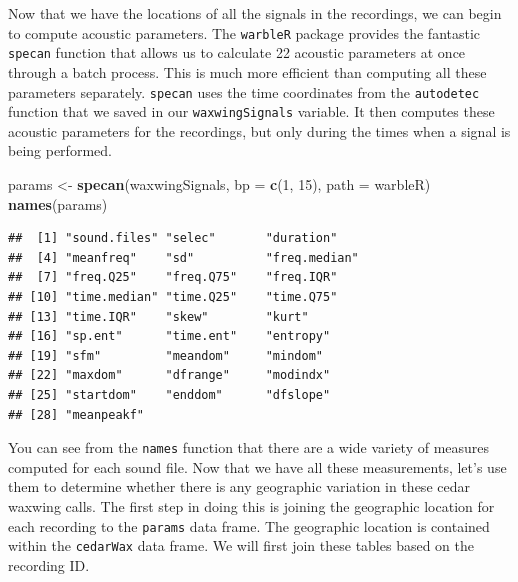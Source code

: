 \documentclass[
]{krantz}
\newenvironment{Shaded}{\begin{snugshade}}{\end{snugshade}}
\newcommand{\CharTok}[1]{\textcolor[rgb]{0.31,0.60,0.02}{#1}}
\newcommand{\DataTypeTok}[1]{\textcolor[rgb]{0.13,0.29,0.53}{#1}}
\newcommand{\DecValTok}[1]{\textcolor[rgb]{0.00,0.00,0.81}{#1}}
\newcommand{\KeywordTok}[1]{\textcolor[rgb]{0.13,0.29,0.53}{\textbf{#1}}}
\newcommand{\NormalTok}[1]{#1}
\newcommand{\OperatorTok}[1]{\textcolor[rgb]{0.81,0.36,0.00}{\textbf{#1}}}
\newcommand{\StringTok}[1]{\textcolor[rgb]{0.31,0.60,0.02}{#1}}
\begin{document}
Now that we have the locations of all the signals in the recordings, we can begin to compute acoustic parameters. The \texttt{warbleR} package provides the fantastic \texttt{specan} function that allows us to calculate 22 acoustic parameters at once through a batch process. This is much more efficient than computing all these parameters separately. \texttt{specan} uses the time coordinates from the \texttt{autodetec} function that we saved in our \texttt{waxwingSignals} variable. It then computes these acoustic parameters for the recordings, but only during the times when a signal is being performed.

\begin{Shaded}
\begin{Highlighting}[]
\NormalTok{params \textless{}{-}}\StringTok{ }\KeywordTok{specan}\NormalTok{(waxwingSignals, }\DataTypeTok{bp =} \KeywordTok{c}\NormalTok{(}\DecValTok{1}\NormalTok{, }\DecValTok{15}\NormalTok{), }\DataTypeTok{path =} \StringTok{\textquotesingle{}warbleR\textquotesingle{}}\NormalTok{) }
\KeywordTok{names}\NormalTok{(params) }
\end{Highlighting}
\end{Shaded}

\begin{verbatim}
##  [1] "sound.files" "selec"       "duration"   
##  [4] "meanfreq"    "sd"          "freq.median"
##  [7] "freq.Q25"    "freq.Q75"    "freq.IQR"   
## [10] "time.median" "time.Q25"    "time.Q75"   
## [13] "time.IQR"    "skew"        "kurt"       
## [16] "sp.ent"      "time.ent"    "entropy"    
## [19] "sfm"         "meandom"     "mindom"     
## [22] "maxdom"      "dfrange"     "modindx"    
## [25] "startdom"    "enddom"      "dfslope"    
## [28] "meanpeakf"
\end{verbatim}

You can see from the \texttt{names} function that there are a wide variety of measures computed for each sound file. Now that we have all these measurements, let's use them to determine whether there is any geographic variation in these cedar waxwing calls. The first step in doing this is joining the geographic location for each recording to the \texttt{params} data frame. The geographic location is contained within the \texttt{cedarWax} data frame. We will first join these tables based on the recording ID.

\begin{Shaded}
\end{Shaded}
\end{document}
